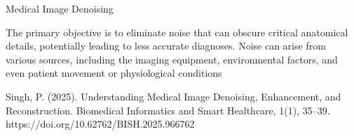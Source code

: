 Medical Image Denoising

The primary objective is to eliminate noise that can obscure critical anatomical details, potentially leading to less accurate diagnoses. Noise can arise from various sources, including the imaging equipment, environmental factors, and even patient movement or physiological conditions

Singh, P. (2025). Understanding Medical Image Denoising, Enhancement, and Reconstruction. Biomedical Informatics and Smart Healthcare, 1(1), 35–39. https://doi.org/10.62762/BISH.2025.966762

